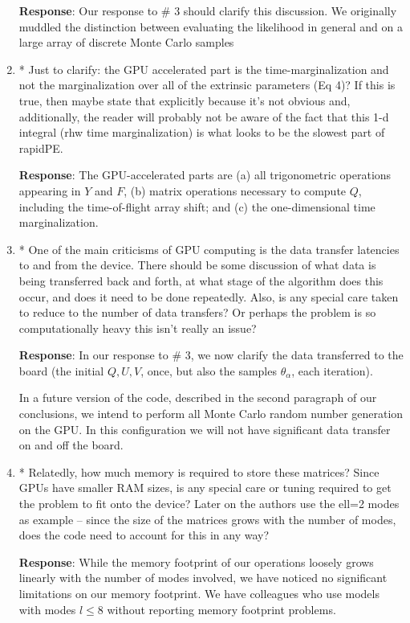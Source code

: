 \documentclass[onecolumn]{revtex4}
\begin{document}
\begin{enumerate}
\noindent \textbf{Response}: Our response to \# 3 should clarify this discussion.  We originally muddled the distinction
between evaluating the likelihood in general and on a large array of discrete  Monte Carlo samples

\item * Just to clarify: the GPU accelerated part is the
time-marginalization and not the marginalization over all of the
extrinsic parameters (Eq 4)? If this is true, then maybe state that
explicitly because it's not obvious and, additionally, the reader will
probably not be aware of the fact that this 1-d integral (rhw time
marginalization) is what looks to be the slowest part of rapidPE.

\noindent \textbf{Response}: The GPU-accelerated parts are (a) all trigonometric operations appearing in $Y$ and $F$, (b)  matrix operations
necessary to compute $Q$, including the time-of-flight array shift; and (c) the one-dimensional time marginalization.

\item * One of the main criticisms of GPU computing is the data transfer
latencies to and from the device. There should be some discussion of
what data is being transferred back and forth, at what stage of the
algorithm does this occur, and does it need to be done repeatedly.
Also, is any special care taken to reduce to the number of data
transfers? Or perhaps the problem is so computationally heavy this
isn't really an issue?

\noindent \textbf{Response}: In our response to \# 3, we now clarify the data transferred to the board (the initial
$Q,U,V$, once,  but also the samples $\theta_\alpha$, each iteration).  

In a future version of the code, described in the second paragraph of our conclusions, we intend to perform all Monte
Carlo random number generation on the GPU.  In this configuration we will not have significant data transfer on and off
the board.

\item * Relatedly, how much memory is required to store these matrices?
Since GPUs have smaller RAM sizes, is any special care or tuning
required to get the problem to fit onto the device? Later on the
authors use the ell=2 modes as example -- since the size of the
matrices grows with the number of modes, does the code need to account
for this in any way?

\noindent \textbf{Response}: While the memory footprint of our operations loosely grows linearly with the number of
modes involved, we have noticed no significant limitations on our memory footprint.  We have colleagues who use models with modes
$l \le 8$ without reporting memory footprint problems.   


\end{enumerate}
\end{document}
